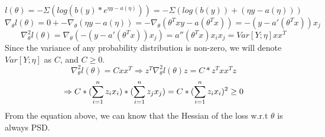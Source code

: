 \begin{answer}
\begin{equation*}
    l(\theta) = -\Sigma (log(b(y)*e^{\eta y -  a(\eta)})) = -\Sigma (log(b(y)) + (\eta y - a(\eta)))
\end{equation*}
\begin{equation*}
    \nabla_\theta l(\theta) = 0 + -\nabla_\theta(\eta y - a(\eta)) = -\nabla_\theta(\theta^{T}x y - a(\theta^{T}x)) = -(y - a'(\theta^{T}x))x_j
\end{equation*}
\begin{equation*}
    \nabla^{2}_\theta l(\theta) = \nabla_\theta(-(y - a'(\theta^{T}x))x_j) = a''(\theta^{T}x)x_ix_j = Var[Y;\eta]xx^{T}
\end{equation*}
Since the variance of any probability distribution is non-zero, we will denote $Var[Y;\eta]$ as $C$, and $C \geq 0$.
\begin{equation*}
    \nabla^{2}_\theta l(\theta) = Cxx^{T} \Rightarrow z^{T} \nabla^{2}_\theta l(\theta)z = C*z^{T}xx^{T}z
\end{equation*}
\begin{equation*}
    \Rightarrow C*(\sum_{i=1}^{n} z_ix_i)*(\sum_{i=1}^{n} z_jx_j) = C*(\sum_{i=1}^{n} z_ix_i)^{2} \geq 0
\end{equation*}
From the equation above, we can know that the Hessian of the loss w.r.t $\theta$ is always PSD.
\end{answer}
